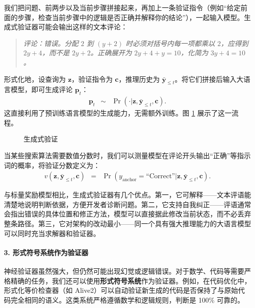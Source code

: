 我们把问题、前两步以及当前步骤拼接起来，再加上一条验证指令（例如“给定前面的步骤，检查当前步骤中的逻辑是否正确并解释你的结论”），一起输入模型。生成式验证器可能会输出这样的文本评论：
\vspace{0.5em}
\begin{quote}
\textit{评论：错误。分配 $2$ 到 $(y+2)$ 时必须对括号内每一项都乘以 $2$，应得到 $2y + 4$，而不是 $2y + 2$。正确展开为 $2y + 4 + y = 10$，化简为 $3y + 4 = 10$。}
\end{quote}
\vspace{0.5em}

形式化地，设查询为 $\mathbf{z}$，验证指令为 $\mathbf{c}$，推理历史为 $\bar{\mathbf{y}}_{\le t}$。将它们拼接后输入大语言模型，即可生成评论 $\mathbf{p}_t$：
\begin{eqnarray}
\mathbf{p}_t & \sim & \Pr(\cdot | \mathbf{z}, \bar{\mathbf{y}}_{\le t}, \mathbf{c}).
\end{eqnarray}
这直接利用了预训练语言模型的生成能力，无需额外训练。图 \ref{fig:pre-generative-verfication} 展示了这一流程。

\begin{figure}[!t]
\centering

\caption{生成式验证}
\label{fig:pre-generative-verfication}
\end{figure}

当某些搜索算法需要数值分数时，我们可以测量模型在评论开头输出“正确”等指示词的概率，将验证分数定义为：
\begin{eqnarray}
v(\mathbf{z}, \bar{\mathbf{y}}_{\le t}, \mathbf{c}) & = & \Pr(y_{\mathrm{anchor}} = \text{``Correct''} | \mathbf{z}, \bar{\mathbf{y}}_{\le t}, \mathbf{c}).
\end{eqnarray}

与标量奖励模型相比，生成式验证器有几个优点。第一，它可解释——文本评语能清楚地说明判断依据，方便开发者诊断问题。第二，它支持自我纠正——评语通常会指出错误的具体位置和修正方法，模型可以直接据此修改当前状态，而不必丢弃整条路径。第三，它对架构的改动最小——同一个具有强大推理能力的大语言模型可以同时充当求解器和验证器。

\paragraph{3. 形式符号系统作为验证器}

神经验证器虽然强大，但仍然可能出现幻觉或逻辑错误。对于数学、代码等需要严格精确的任务，我们还可以使用\textbf{形式符号系统}作为验证器。例如，在代码优化中，形式化等价检查器（如 Alive2）可以自动验证新生成的代码是否保持了与原始代码完全相同的语义。这类系统严格遵循数学和逻辑规则，判断是 100\% 可靠的。

